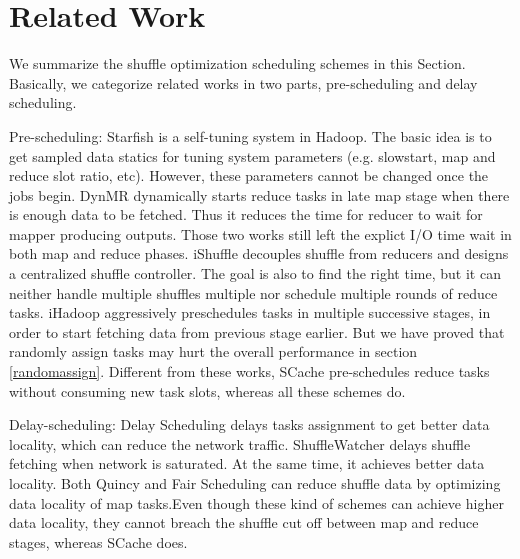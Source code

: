 \section{Related Work}
We summarize the shuffle optimization scheduling schemes in this Section. Basically, we categorize related works in two parts, pre-scheduling and delay scheduling.

Pre-scheduling: Starfish\cite{starfish} is a self-tuning system in Hadoop. The basic idea is to get sampled data statics for tuning system parameters (e.g. slowstart, map and reduce slot ratio, etc). However, these parameters cannot be changed once the jobs begin. DynMR\cite{dynmr} dynamically starts reduce tasks in late map stage when there is enough data to be fetched. Thus it reduces the time for reducer to wait for mapper producing outputs. Those two works still left the explict I/O time wait in both map and reduce phases. iShuffle\cite{ishuffle} decouples shuffle from reducers and designs a centralized shuffle controller. The goal is also to find the right time, but it can neither handle multiple shuffles multiple nor schedule multiple rounds of reduce tasks. iHadoop\cite{ihadoop} aggressively preschedules tasks in multiple successive stages, in order to start fetching data from previous stage earlier. But we have proved that randomly assign tasks may hurt the overall performance in section \ref{randomassign}. Different from these works, SCache pre-schedules reduce tasks without consuming new task slots, whereas all these schemes do.

Delay-scheduling: Delay Scheduling\cite{delay} delays tasks assignment to get better data locality, which can reduce the network traffic. ShuffleWatcher\cite{shufflewatcher} delays shuffle fetching when network is saturated. At the same time, it achieves better data locality. Both Quincy\cite{quincy} and Fair Scheduling\cite{preemptive} can reduce shuffle data by optimizing data locality of map tasks.Even though these kind of schemes can achieve higher data locality, they cannot breach the shuffle cut off between map and reduce stages, whereas SCache does. 